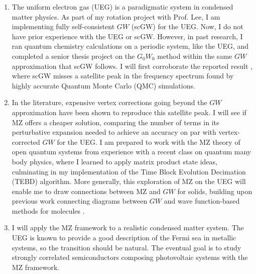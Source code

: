 \begin{enumerate}[label=\textbf{Aim \arabic*}]
    \item The uniform electron gas (UEG) is a paradigmatic system in condensed matter physics. As part of my rotation project with Prof. Lee, I am implementing fully self-consistent $GW$ (scGW) for the UEG. Now, I do not have prior experience with the UEG or scGW. However, in past research, I ran quantum chemistry calculations on a periodic system, like the UEG, and completed a senior thesis project on the $G_0W_0$ method within the same $GW$ approximation that scGW follows. I will first corroborate the reported result \cite{holm_fully_1998}, where scGW misses a satellite peak in the frequency spectrum found by highly accurate Quantum Monte Carlo (QMC) simulations.
    \item In the literature, expensive vertex corrections going beyond the $GW$ approximation have been shown to reproduce this satellite peak. I will see if MZ offers a cheaper solution, comparing the number of terms in its perturbative expansion needed to achieve an accuracy on par with vertex-corrected $GW$ for the UEG. I am prepared to work with the MZ theory of open quantum systems from experience with a recent class on quantum many body physics, where I learned to apply matrix product state ideas, culminating in my implementation of the Time Block Evolution Decimation (TEBD) algorithm. More generally, this exploration of MZ on the UEG will enable me to draw connections between MZ and $GW$ for solids, building upon previous work connecting diagrams between $GW$ and wave function-based methods for molecules \cite{Lange_2018}.

    \item I will apply the MZ framework to a realistic condensed matter system. The UEG is known to provide a good description of the Fermi sea in metallic systems, so the transition should be natural. The eventual goal is to study strongly correlated semiconductors composing photovoltaic systems with the MZ framework.
\end{enumerate}